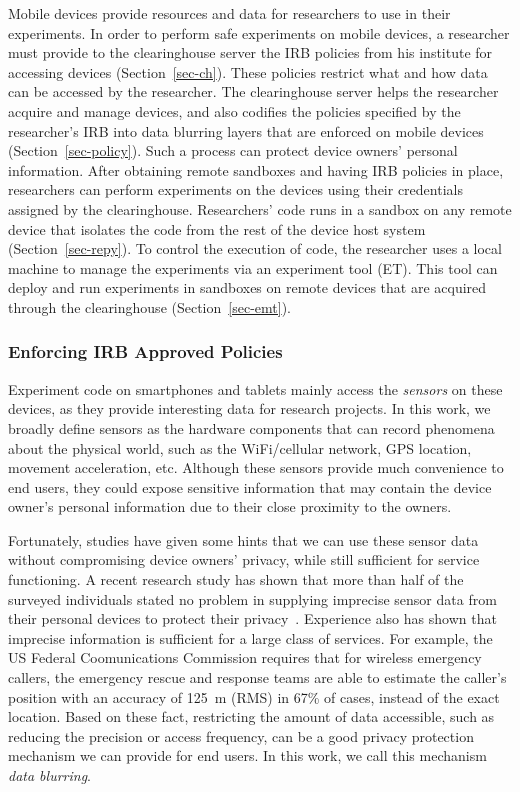 Mobile devices
provide resources and data for researchers to use in their
experiments. In order to perform safe experiments on mobile
devices, a researcher must provide to the clearinghouse server
the IRB policies from his institute for accessing devices 
(Section~\ref{sec-ch}).  These 
policies restrict what and how data can be accessed by the 
researcher. The
clearinghouse server helps the researcher acquire and manage
devices, and also codifies the policies specified by the
researcher's IRB into data blurring layers that are enforced on
mobile devices (Section~\ref{sec-policy}). Such a process can protect device
owners' personal information. After obtaining remote sandboxes
and having IRB policies in place, researchers can perform
experiments on the devices using their credentials assigned by
the clearinghouse. Researchers' code runs in a sandbox on any
remote device that isolates the code from the rest of the device
host system (Section~\ref{sec-repy}). To control the execution of 
code, the researcher uses a local machine to manage the 
experiments via an experiment tool (ET). This tool can deploy 
and run experiments in sandboxes on remote devices that are 
acquired through the clearinghouse (Section~\ref{sec-emt}).

\subsubsection{Enforcing IRB Approved Policies}
Experiment code on smartphones and tablets mainly access
the \textit{sensors} on these devices, as they provide  
interesting data for research projects. In this work, we broadly 
define sensors as the hardware components that can record 
phenomena about the physical world, such as the WiFi/cellular 
network, GPS location, movement acceleration, etc. Although
these sensors provide much convenience to end users, they 
could expose sensitive information that may contain the device 
owner's personal information due to their close proximity to 
the owners.

Fortunately, studies have given some hints that we can use 
these sensor data without compromising device owners' privacy, 
while still sufficient for service functioning.
A recent research study has shown that more than half of the 
surveyed individuals stated no problem in supplying imprecise 
sensor data from their personal devices to protect their 
privacy~\cite{fawaz2014location}. Experience also has shown 
that imprecise information is sufficient for a large class of 
services. For example, the US Federal Coomunications 
Commission requires that for wireless emergency callers, the 
emergency rescue and response teams are able to estimate the 
caller's position with an accuracy of 125~m (RMS) in 67\% of
cases, instead of the exact location. Based on these fact, restricting 
the amount of data accessible, such as reducing the precision or 
access frequency, can be a good privacy protection mechanism we can 
provide for end users. In this work, we call this mechanism 
\textit{data blurring}.

